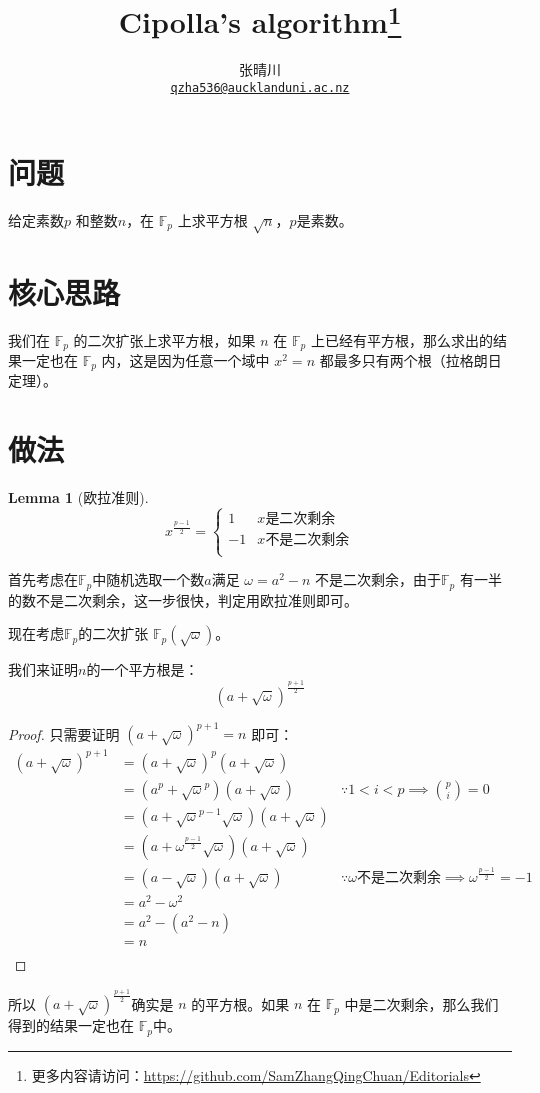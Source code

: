 \documentclass{article}
\title{Cipolla's algorithm\footnote{更多内容请访问：\url{https://github.com/SamZhangQingChuan/Editorials}}}
\author{张晴川\\\href{mailto:qzha536@aucklanduni.ac.nz}{\texttt{qzha536@aucklanduni.ac.nz}}}
\newtheorem*{lemma*}{Lemma}
\begin{document}
\maketitle

\section{问题}
\begin{center}
给定素数$p$ 和整数$n$，在 $\mathbb{F}_p$ 上求平方根 $\sqrt{n}$，$p$是素数。
\end{center}
\section{核心思路}
我们在 $\mathbb{F}_p$ 的二次扩张上求平方根，如果 $n$ 在 $\mathbb{F}_p$ 上已经有平方根，那么求出的结果一定也在 $\mathbb{F}_p$ 内，这是因为任意一个域中 $x^2 = n$ 都最多只有两个根（拉格朗日定理）。

\section{做法}


\begin{lemma*}[欧拉准则]
    $$
        x^{\frac{p-1}{2}} = 
            \begin{cases}
                1 & x\text{是二次剩余} \\
                -1 & x\text{不是二次剩余} \\
            \end{cases}
    $$
\end{lemma*}
首先考虑在$\mathbb{F}_p$中随机选取一个数$a$满足 $\omega = a^2 - n$ 不是二次剩余，由于$\mathbb{F}_p$ 有一半的数不是二次剩余，这一步很快，判定用欧拉准则即可。

现在考虑$\mathbb{F}_p$的二次扩张 $\mathbb{F}_p(\sqrt{\omega})$。

我们来证明$n$的一个平方根是：
$$
    (a+\sqrt{\omega})^{\frac{p+1}{2}}
$$

\begin{proof}
只需要证明 $(a+\sqrt{\omega})^{p+1} = n$ 即可：
\begin{align*}
    (a+\sqrt{\omega})^{p+1}
    &= (a+\sqrt{\omega})^{p}(a+\sqrt{\omega})\\
    &= (a^p+\sqrt{\omega}^p)(a+\sqrt{\omega}) &  \because 1< i<p \implies \binom{p}{i} = 0\\
    &= (a+\sqrt{\omega}^{p-1}\sqrt{\omega})(a+\sqrt{\omega}) \\
    &= (a+\omega^{\frac{p-1}{2}}\sqrt{\omega})(a+\sqrt{\omega}) \\
    &= (a-\sqrt{\omega})(a+\sqrt{\omega})&  \because \omega \text{不是二次剩余} \implies \omega^{\frac{p-1}{2}} = -1 \\
    &= a^2-\omega ^2 \\
    &= a^2-(a^2-n) \\
    &= n \\
\end{align*}
\end{proof}

所以 $(a+\sqrt{\omega})^{\frac{p+1}{2}}$确实是 $n$ 的平方根。如果 $n$ 在 $\mathbb{F}_p$ 中是二次剩余，那么我们得到的结果一定也在 $\mathbb{F}_p$中。
\end{document}
